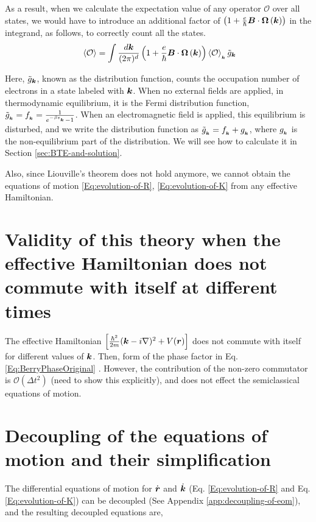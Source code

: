 \documentclass{revtex4-2}
\renewcommand\vec[1]{\ensuremath\boldsymbol{#1}} %
\begin{document}
As a result, when we calculate the expectation value of any operator $\mathcal{O}$ over all states, we would have to introduce an additional factor of $\left(1 + \frac{e}{\hbar} \vec{B} \cdot \vec{\Omega}\left(\vec{k}\right)\right)$ in the integrand, as follows, to correctly count all the states.
\begin{equation}~\label{Eq:operator}
\expval{\mathcal{O}} = \int \frac{d\vec{k}}{(2\pi)^d} \left(1 + \frac{e}{\hbar} \vec{B} \cdot  \vec{\Omega}\left(\vec{k}\right)\right) \expval{\mathcal{O}}_{_{\vec{k}}} \tilde{g}_{\vec{k}}
\end{equation}

Here, $\tilde{g}_{\vec{k}}$, known as the distribution function, counts the occupation number of electrons in a state labeled with $\vec{k}$. When no external fields are applied, in thermodynamic equilibrium, it is the Fermi distribution function, $\tilde{g}_{_{\vec{k}}} = f_{_{\vec{k}}} = \frac{1}{e^{-\beta \varepsilon_{_{\vec{k}}}} - 1}$. When an electromagnetic field is applied, this equilibrium is disturbed, and we write the distribution function as $\tilde{g}_{_{\vec{k}}} = f_{_{\vec{k}}} + g_{_{\vec{k}}}$, where $g_{_{\vec{k}}}$ is the non-equilibrium part of the distribution. We will see how to calculate it in Section \ref{sec:BTE-and-solution}.

Also, since Liouville's theorem does not hold anymore, we cannot obtain the equations of motion \eqref{Eq:evolution-of-R}, \eqref{Eq:evolution-of-K} from any effective Hamiltonian.
\section{Validity of this theory when the effective Hamiltonian does not commute with itself at different times}
The effective Hamiltonian $\left[\frac{\hbar^2}{2m}(\vec{k} - i \nabla)^2 + V(\vec{r}) \right]$ does not commute with itself for different values of $\vec{k}$. Then, form of the phase factor in Eq. \eqref{Eq:BerryPhaseOriginal} . However, the contribution of the non-zero commutator is $\mathcal{O} \left(\Delta{t}^2\right)$ (need to show this explicitly), and does not effect the semiclassical equations of motion.
\section{Decoupling of the equations of motion and their simplification}

The differential equations of motion for $\dot{\vec{r}}$ and $\dot{\vec{k}}$ (Eq. \ref{Eq:evolution-of-R} and Eq. \ref{Eq:evolution-of-K}) can be decoupled (See Appendix \ref{app:decoupling-of-eom}), and the resulting decoupled equations are,
\end{document}
